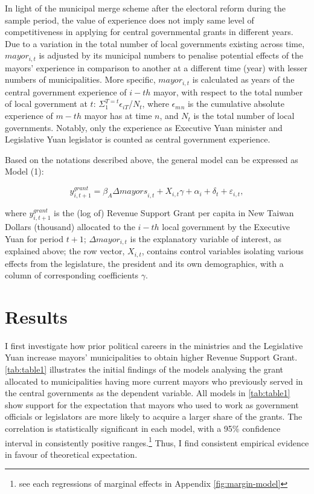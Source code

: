 In light of the municipal merge scheme after the electoral reform during the sample period, the value of experience does not imply same level of competitiveness in applying for central governmental grants in different years. Due to a variation in the total number of local governments existing across time, $mayor_{i,t}$ is adjusted by its municipal numbers to penalise potential effects of the mayors' experience in comparison to another at a different time (year) with lesser numbers of municipalities. More specific, $mayor_{i,t}$ is calculated as years of the central government experience of $i-th$ mayor, with respect to the total number of local government at $t$: $\Sigma_{1}^{T=t}\epsilon_{iT}$/$N_t$, where $\epsilon_m{}_n$ is the cumulative absolute experience of $m-th$ mayor has at time $n$, and $N_t$ is the total number of local governments. Notably, only the experience as Executive Yuan minister and Legislative Yuan legislator is counted as central government experience.

Based on the notations described above, the general model can be expressed
as Model (1):

\begin{equation} \ensuremath{y_{i,t+1}^{grant}}=\ensuremath{\beta_{A}{\Delta mayors}_{i,t} + X_{i,t}\gamma + \alpha_{i} + \delta_{t} + \varepsilon_{i,t}},\end{equation}

where $y_{i,t+1}^{grant}$ is the (log of) Revenue Support Grant per capita in New Taiwan Dollars (thousand) allocated to the $i-th$ local government by the Executive Yuan for period $t+1$; $\Delta mayor_{i,t}$ is the explanatory variable of interest, as explained above; the row vector, $X_{i,t}$, contains control variables isolating various effects from the legislature, the president and its own demographics, with
a column of corresponding coefficients $\gamma$. 



\section*{\centering Results}
I first investigate how prior political careers in the ministries and the Legislative Yuan increase mayors' municipalities to obtain higher Revenue Support Grant. \autoref{tab:table1} illustrates the initial findings of the models analysing the grant allocated to municipalities having more current mayors who previously served in the central governments as the dependent variable. All models in \autoref{tab:table1} show support for the expectation that mayors who used to work as government officials or legislators are more likely to acquire a larger share of the grants. The correlation is statistically significant in each model, with a 95\% confidence interval in consistently positive ranges.\footnote{see each regressions of marginal effects in Appendix \ref{fig:margin-model} } Thus, I find consistent empirical evidence in favour of theoretical expectation.


